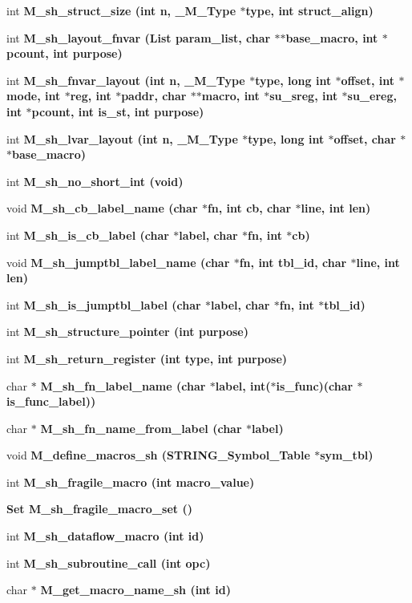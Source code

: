 \begin{CompactItemize}
\item 
int \bf{M\_\-sh\_\-struct\_\-size} (int n, \bf{\_\-M\_\-Type} $\ast$type, int struct\_\-align)
\item 
int \bf{M\_\-sh\_\-layout\_\-fnvar} (\bf{List} param\_\-list, char $\ast$$\ast$base\_\-macro, int $\ast$pcount, int purpose)
\item 
int \bf{M\_\-sh\_\-fnvar\_\-layout} (int n, \bf{\_\-M\_\-Type} $\ast$type, long int $\ast$offset, int $\ast$\bf{mode}, int $\ast$reg, int $\ast$paddr, char $\ast$$\ast$macro, int $\ast$su\_\-sreg, int $\ast$su\_\-ereg, int $\ast$pcount, int is\_\-st, int purpose)
\item 
int \bf{M\_\-sh\_\-lvar\_\-layout} (int n, \bf{\_\-M\_\-Type} $\ast$type, long int $\ast$offset, char $\ast$$\ast$base\_\-macro)
\item 
int \bf{M\_\-sh\_\-no\_\-short\_\-int} (void)
\item 
void \bf{M\_\-sh\_\-cb\_\-label\_\-name} (char $\ast$fn, int cb, char $\ast$line, int len)
\item 
int \bf{M\_\-sh\_\-is\_\-cb\_\-label} (char $\ast$label, char $\ast$fn, int $\ast$cb)
\item 
void \bf{M\_\-sh\_\-jumptbl\_\-label\_\-name} (char $\ast$fn, int tbl\_\-id, char $\ast$line, int len)
\item 
int \bf{M\_\-sh\_\-is\_\-jumptbl\_\-label} (char $\ast$label, char $\ast$fn, int $\ast$tbl\_\-id)
\item 
int \bf{M\_\-sh\_\-structure\_\-pointer} (int purpose)
\item 
int \bf{M\_\-sh\_\-return\_\-register} (int type, int purpose)
\item 
char $\ast$ \bf{M\_\-sh\_\-fn\_\-label\_\-name} (char $\ast$label, int($\ast$is\_\-func)(char $\ast$is\_\-func\_\-label))
\item 
char $\ast$ \bf{M\_\-sh\_\-fn\_\-name\_\-from\_\-label} (char $\ast$label)
\item 
void \bf{M\_\-define\_\-macros\_\-sh} (\bf{STRING\_\-Symbol\_\-Table} $\ast$sym\_\-tbl)
\item 
int \bf{M\_\-sh\_\-fragile\_\-macro} (int macro\_\-value)
\item 
\bf{Set} \bf{M\_\-sh\_\-fragile\_\-macro\_\-set} ()
\item 
int \bf{M\_\-sh\_\-dataflow\_\-macro} (int id)
\item 
int \bf{M\_\-sh\_\-subroutine\_\-call} (int opc)
\item 
char $\ast$ \bf{M\_\-get\_\-macro\_\-name\_\-sh} (int id)
\item 
$$
\end{CompactItemize}
